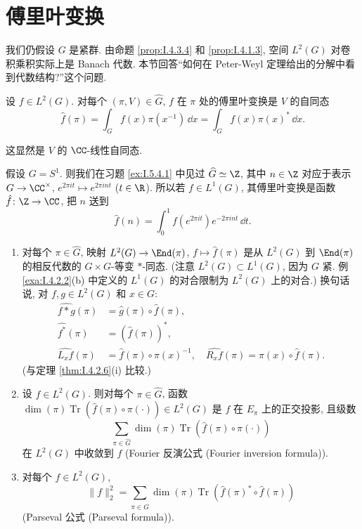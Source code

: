 \section{傅里叶变换}

我们仍假设 $G$ 是紧群.
由命题 \ref{prop:I.4.3.4} 和 \ref{prop:I.4.1.3}, 空间 $L^2(G)$ 对卷积乘积实际上是 Banach 代数. 本节回答``如何在 Peter-Weyl 定理给出的分解中看到代数结构?''这个问题.

\begin{definition}
\label{def:IV.6.1}
设 $f \in L^2(G)$. 对每个 $(\pi, V) \in \widehat{G}$, $f$ 在 $\pi$ 处的傅里叶变换是 $V$ 的自同态
\[
\hat{f}(\pi) = \int_G f(x)\pi(x^{-1})\,\dd x = \int_G f(x)\pi(x)^*\,\dd x.
\]
\end{definition}

这显然是 $V$ 的 $\CC$-线性自同态.

\begin{example}[$G = S^1$ 的情形]
\label{exa:IV.6.2}
假设 $G = S^1$. 则我们在习题 \ref{ex:I.5.4.1} 中见过 $\widehat{G} \simeq \Z$, 其中 $n \in \Z$ 对应于表示 $G \to \CC^{\times}$, $e^{2\pi it} \longmapsto e^{2\pi int}$ ($t \in \R$). 所以若 $f \in L^1(G)$, 其傅里叶变换是函数 $\hat{f} \colon \Z \to \CC$, 把 $n$ 送到
\[
\hat{f}(n) = \int_0^1 f(e^{2\pi it})e^{-2\pi int}\,\dd t.
\]
\end{example}

\begin{theorem}[傅里叶变换的性质]
\label{thm:IV.6.3}
\begin{enumerate}
\item[(i)] 对每个 $\pi \in \widehat{G}$, 映射 $L^2(G) \to \End(\pi)$, $f \longmapsto \hat{f}(\pi)$ 是从 $L^2(G)$ 到 $\End(\pi)$ 的相反代数的 $G \times G$-等变 $*$-同态. (注意 $L^2(G) \subset L^1(G)$, 因为 $G$ 紧. 例 \ref{exa:I.4.2.2}(b) 中定义的 $L^1(G)$ 的对合限制为 $L^2(G)$ 上的对合.)
换句话说, 对 $f, g \in L^2(G)$ 和 $x \in G$:
\begin{align*}
\widehat{f * g}(\pi) &= \hat{g}(\pi) \circ \hat{f}(\pi), \\
\widehat{f^*}(\pi) &= (\hat{f}(\pi))^*, \\
\widehat{L_xf}(\pi) &= \hat{f}(\pi) \circ \pi(x)^{-1}, \quad \widehat{R_xf}(\pi) = \pi(x) \circ \hat{f}(\pi).
\end{align*}
(与定理 \ref{thm:I.4.2.6}(i) 比较.)
\item[(ii)] 设 $f \in L^2(G)$. 则对每个 $\pi \in \widehat{G}$, 函数 $\dim(\pi)\operatorname{Tr}(\hat{f}(\pi) \circ \pi(\cdot)) \in L^2(G)$ 是 $f$ 在 $E_{\pi}$ 上的正交投影, 且级数
\[
\sum_{\pi \in \widehat{G}}\dim(\pi)\operatorname{Tr}(\hat{f}(\pi) \circ \pi(\cdot))
\]
在 $L^2(G)$ 中收敛到 $f$ (Fourier 反演公式 (Fourier inversion formula)).
\item[(iii)] 对每个 $f \in L^2(G)$,
\[
\|f\|_2^2 = \sum_{\pi \in \widehat{G}}\dim(\pi)\operatorname{Tr}(\hat{f}(\pi)^* \circ \hat{f}(\pi))
\]
(Parseval 公式 (Parseval formula)).
\end{enumerate}
\end{theorem}

